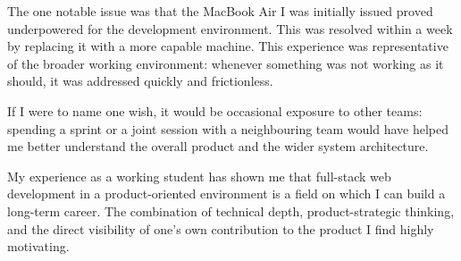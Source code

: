 \documentclass[a4paper, 12pt]{article}
\begin{document}
The one notable issue was that the MacBook Air I was initially issued proved
underpowered for the development environment. This was resolved within a week
by replacing it with a more capable machine. This experience was representative of the
broader working environment: whenever something was not working as it should, it was
addressed quickly and frictionless.

If I were to name one wish, it would be occasional exposure to other teams: spending a
sprint or a joint session with a neighbouring team would have helped me better
understand the overall product and the wider system architecture.

My experience as a working student has shown me that full-stack web development in a
product-oriented environment is a field on which I can build a long-term career. The
combination of technical depth, product-strategic thinking, and the direct visibility
of one's own contribution to the product I find highly motivating.


\printbibliography


\end{document}
